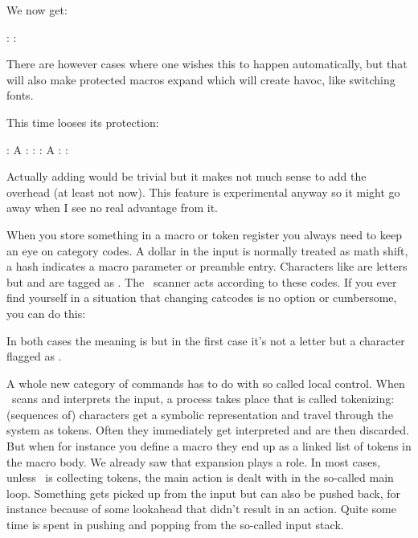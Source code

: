 \typebuffer[option=TEX] \getbuffer

We now get:

\startlines
\type{\TestC} : {\tttf \meaningless\TestC}
\type{\TestD} : {\tttf \meaningless\TestD}
\stoplines

There are however cases where one wishes this to happen automatically, but that
will also make protected macros expand which will create havoc, like switching fonts.

\startbuffer
               \def\TestA{A}
\protected     {}
\semiprotected {}
              \edef\TestD{\TestA\TestB\TestC}
              \edef\TestE{\normalexpanded{\TestA\TestB\TestC}}
              \edef\TestF{\semiexpanded  {\TestA\TestB\TestC}}
\stopbuffer

\typebuffer[option=TEX] \getbuffer

This time \type {\TestC} looses its protection:

\startlines
\type{\TestA} : {\tttf \meaningless\TestA}
\type{\TestB} : {\tttf \meaningless\TestB}
\type{\TestC} : {\tttf \meaningless\TestC}
\type{\TestD} : {\tttf \meaningless\TestD}
\type{\TestE} : {\tttf \meaningless\TestE}
\type{\TestF} : {\tttf \meaningless\TestF}
\stoplines

Actually adding \type {\fullyexpanded} would be trivial but it makes not much
sense to add the overhead (at least not now). This feature is experimental
anyway so it might go away when I see no real advantage from it.

When you store something in a macro or token register you always need to keep an
eye on category codes. A dollar in the input is normally treated as math shift, a
hash indicates a macro parameter or preamble entry. Characters like 
are letters but \quote {[} and \quote {]} are tagged as . The \TEX\
scanner acts according to these codes. If you ever find yourself in a situation
that changing catcodes is no option or cumbersome, you can do this:

\starttyping[option=TEX]
\edef{}
\edef\TestLA{\expandtoken\lettercatcode`A}
\stoptyping

In both cases the meaning is  but in the first case it's not a letter
but a character flagged as \quote {other}.

A whole new category of commands has to do with so called local control. When
\TEX\ scans and interprets the input, a process takes place that is called
tokenizing: (sequences of) characters get a symbolic representation and travel
through the system as tokens. Often they immediately get interpreted and are then
discarded. But when for instance you define a macro they end up as a linked list
of tokens in the macro body. We already saw that expansion plays a role. In most
cases, unless \TEX\ is collecting tokens, the main action is dealt with in the so-called
main loop. Something gets picked up from the input but can also be pushed
back, for instance because of some lookahead that didn't result in an action.
Quite some time is spent in pushing and popping from the so-called input stack.

